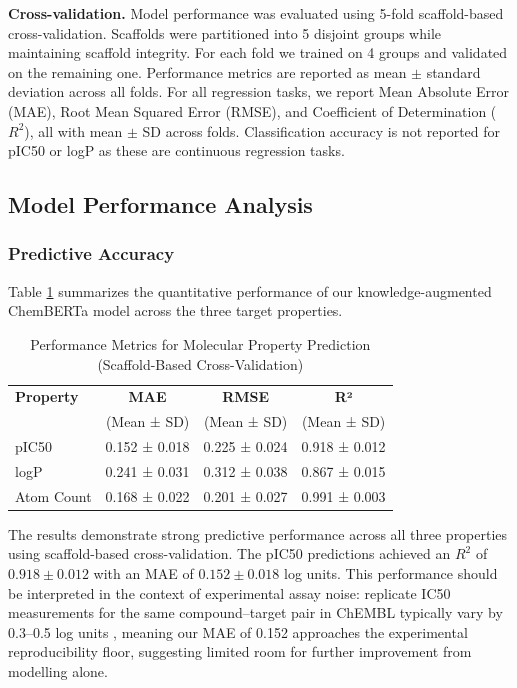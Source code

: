\documentclass[preprint,12pt]{elsarticle}
\begin{document}
\textbf{Cross-validation.}
Model performance was evaluated using 5-fold scaffold-based cross-validation. Scaffolds were partitioned into 5 disjoint groups while maintaining scaffold integrity. For each fold we trained on 4 groups and validated on the remaining one. Performance metrics are reported as mean $\pm$ standard deviation across all folds. For all regression tasks, we report Mean Absolute Error (MAE), Root Mean Squared Error (RMSE), and Coefficient of Determination ($R^2$), all with mean $\pm$ SD across folds. Classification accuracy is not reported for pIC50 or logP as these are continuous regression tasks.

\subsection{Model Performance Analysis}

\subsubsection*{Predictive Accuracy}

Table \ref{tab:performance_metrics} summarizes the quantitative performance of our knowledge-augmented ChemBERTa model across the three target properties.

\begin{table}[H]
\centering
\caption{Performance Metrics for Molecular Property Prediction (Scaffold-Based Cross-Validation)}
\label{tab:performance_metrics}
\small
\begin{tabular}{lccc}
\toprule
\textbf{Property} & \textbf{MAE} & \textbf{RMSE } & \textbf{R² } \\
 & (Mean ± SD) & (Mean ± SD) & (Mean ± SD) \\
\midrule
pIC50        & 0.152 ± 0.018 & 0.225 ± 0.024 & 0.918 ± 0.012 \\
logP         & 0.241 ± 0.031 & 0.312 ± 0.038 & 0.867 ± 0.015 \\
Atom Count   & 0.168 ± 0.022 & 0.201 ± 0.027 & 0.991 ± 0.003 \\
\bottomrule
\end{tabular}
\end{table}

The results demonstrate strong predictive performance across all three properties using scaffold-based cross-validation. The pIC50 predictions achieved an $R^2$ of $0.918 \pm 0.012$ with an MAE of $0.152 \pm 0.018$ log units. This performance should be interpreted in the context of experimental assay noise: replicate IC50 measurements for the same compound--target pair in ChEMBL typically vary by 0.3--0.5 log units \cite{gaulton2012chembl}, meaning our MAE of 0.152 approaches the experimental reproducibility floor, suggesting limited room for further improvement from modelling alone.
\end{document}
